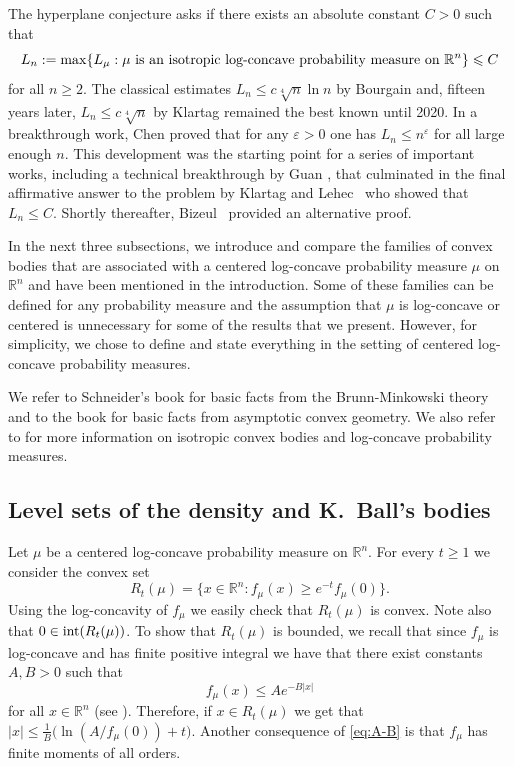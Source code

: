 \documentclass[11pt,leqno]{article}
\theoremstyle{definition}
\theoremstyle{remark}
\numberwithin{equation}{section}
\newcommand{\ls}{\leqslant}
\newcommand{\gr}{\geqslant}
\renewcommand{\epsilon}{\varepsilon}
\newcommand{\1}{\textbf{1}}
\begin{document}
The hyperplane conjecture asks if there exists an absolute constant $C>0$ such that
\begin{equation*}L_n:= \max\{ L_{\mu }:\mu\ \hbox{is an isotropic log-concave probability measure on}\ {\mathbb R}^n\}\ls C\end{equation*}
for all $n\gr 2$. The classical estimates $L_n\ls c\sqrt[4]{n}\ln n$ by Bourgain \cite{Bourgain-1991}
and, fifteen years later, $L_n\ls c\sqrt[4]{n}$ by Klartag \cite{Klartag-2006} remained the best known until
2020. In a breakthrough work, Chen \cite{C} proved that for any $\epsilon >0$
one has $L_n\ls n^{\epsilon}$ for all large enough $n$. This development was the starting point for
a series of important works, including a technical breakthrough by Guan \cite{Guan}, that culminated
in the final affirmative answer to the problem by Klartag and Lehec~\cite{KL} who showed that $L_n\ls C$.
Shortly thereafter, Bizeul~\cite{Bizeul-2025} provided an alternative proof.

In the next three subsections, we introduce and compare the families of convex bodies that are associated with
a centered log-concave probability measure $\mu$ on ${\mathbb R}^n$ and have been mentioned in the introduction.
Some of these families can be defined for any probability measure and the assumption that $\mu$ is log-concave
or centered is unnecessary for some of the results that we present. However, for simplicity, we chose to define
and state everything in the setting of centered log-concave probability measures.

We refer to Schneider's book \cite{Schneider-book} for basic facts from the Brunn-Minkowski theory and to the book
\cite{AGA-book} for basic facts from asymptotic convex geometry. We also refer to \cite{BGVV-book} for more information on isotropic
convex bodies and log-concave probability measures.

\subsection{Level sets of the density and K.~Ball's bodies}\label{subsection-2.1}

Let $\mu$ be a centered log-concave probability measure on $\mathbb{R}^n$. For every $t\gr 1$ we consider the convex set
$$R_t(\mu )=\{x\in {\mathbb R}^n:f_{\mu }(x)\gr e^{-t}f_{\mu }(0)\}.$$
Using the log-concavity of $f_{\mu }$ we easily check that $R_t(\mu )$ is convex. Note also that $0\in {\rm int}(R_t(\mu ))$.
To show that $R_t(\mu)$ is bounded, we recall that since $f_{\mu}$ is log-concave and has finite positive integral we
have that there exist constants $A,B>0$ such that
\begin{equation}\label{eq:A-B}f_{\mu}(x)\ls Ae^{-B|x|}\end{equation}
for all $x\in {\mathbb R}^n$ (see \cite[Lemma~2.2.1]{BGVV-book}). Therefore, if $x\in R_t(\mu)$ we get
that $|x|\ls\frac{1}{B}\big(\ln (A/f_{\mu}(0))+t\big)$. Another consequence of \eqref{eq:A-B} is that $f_{\mu}$ has
finite moments of all orders.
\end{document}
